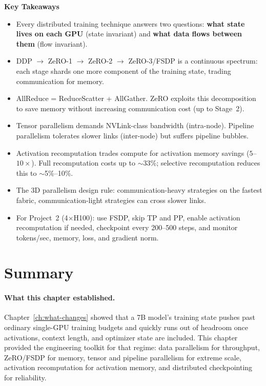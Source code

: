 \begin{takeaways}
\textbf{Key Takeaways}
\begin{itemize}[nosep]
  \item Every distributed training technique answers two questions: \textbf{what state lives on each GPU} (state invariant) and \textbf{what data flows between them} (flow invariant).
  \item DDP $\to$ ZeRO-1 $\to$ ZeRO-2 $\to$ ZeRO-3/FSDP is a continuous spectrum: each stage shards one more component of the training state, trading communication for memory.
  \item AllReduce = ReduceScatter + AllGather. ZeRO exploits this decomposition to save memory without increasing communication cost (up to Stage~2).
  \item Tensor parallelism demands NVLink-class bandwidth (intra-node). Pipeline parallelism tolerates slower links (inter-node) but suffers pipeline bubbles.
  \item Activation recomputation trades compute for activation memory savings ($5$--$10\times$). Full recomputation costs up to $\sim$33\%; selective recomputation reduces this to $\sim$5\%--10\%.
  \item The 3D parallelism design rule: communication-heavy strategies on the fastest fabric, communication-light strategies can cross slower links.
  \item For Project~2 (4$\times$H100): use FSDP, skip TP and PP, enable activation recomputation if needed, checkpoint every 200--500 steps, and monitor tokens/sec, memory, loss, and gradient norm.
\end{itemize}
\end{takeaways}


\section{Summary}

\paragraph{What this chapter established.} Chapter~\ref{ch:what-changes} showed that a 7B model's training state pushes past ordinary single-GPU training budgets and quickly runs out of headroom once activations, context length, and optimizer state are included. This chapter provided the engineering toolkit for that regime: data parallelism for throughput, ZeRO/FSDP for memory, tensor and pipeline parallelism for extreme scale, activation recomputation for activation memory, and distributed checkpointing for reliability.

